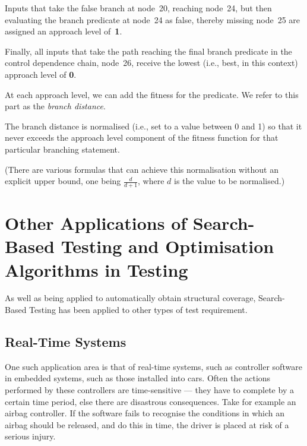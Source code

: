
Inputs that take the false branch at node~20, reaching node~24, but then
evaluating the branch predicate at node~24 as false, thereby missing node~25 are
assigned an approach level of~{\bf 1}. 


Finally, all inputs that take the path reaching the final branch predicate in
the control dependence chain, node~26, receive the lowest (i.e., best, in this
context) approach level of {\bf 0}.



At each approach level, we can add the fitness for the predicate. We refer to
this part as the {\it branch distance}. 


The branch distance is normalised (i.e., set to a value between 0 and 1) so that
it never exceeds the approach level component of the fitness function for that
particular branching statement.


(There are various formulas that can achieve this normalisation without an
explicit upper bound, one being $\frac{d}{d+1}$, where $d$ is the value to be
normalised.)

\section{Other Applications of Search-Based Testing and Optimisation Algorithms
in Testing}

As well as being applied to automatically obtain structural coverage,
Search-Based Testing has been applied to other types of test requirement.


\subsection{Real-Time Systems}

One such application area is that of real-time systems, such as controller
software in embedded systems, such as those installed into cars. Often the
actions performed by these controllers are time-sensitive --- they have to
complete by a certain time period, else there are disastrous consequences. Take
for example an airbag controller. If the software fails to recognise the
conditions in which an airbag should be released, and do this in time, the
driver is placed at risk of a serious injury. 

